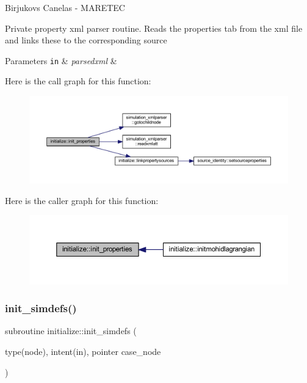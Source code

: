 Birjukovs Canelas -\/ M\+A\+R\+E\+T\+EC 

Private property xml parser routine. Reads the properties tab from the xml file and links these to the corresponding source 
\begin{DoxyParams}[1]{Parameters}
\mbox{\tt in}  & {\em parsedxml} & \\
\hline
\end{DoxyParams}
Here is the call graph for this function\+:
\nopagebreak
\begin{figure}[H]
\begin{center}
\leavevmode
\includegraphics[width=350pt]{namespaceinitialize_a4640ad15e29b88467ec842f274f64b62_cgraph}
\end{center}
\end{figure}
Here is the caller graph for this function\+:
\nopagebreak
\begin{figure}[H]
\begin{center}
\leavevmode
\includegraphics[width=350pt]{namespaceinitialize_a4640ad15e29b88467ec842f274f64b62_icgraph}
\end{center}
\end{figure}
\mbox{\label{namespaceinitialize_adb972e92da4789506ee6b62b702df2b3}} 
\subsubsection{\texorpdfstring{init\+\_\+simdefs()}{init\_simdefs()}}
{\footnotesize\ttfamily subroutine initialize\+::init\+\_\+simdefs (\begin{DoxyParamCaption}\item[{type(node), intent(in), pointer}]{case\+\_\+node }\end{DoxyParamCaption})\hspace{0.3cm}{\ttfamily [private]}}




